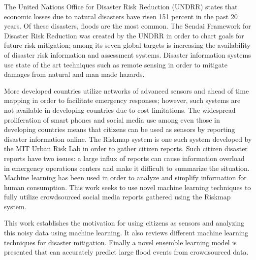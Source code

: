 % 
% 
%


The United Nations Office for Disaster Risk Reduction (UNDRR) states that economic losses
due to natural disasters have risen 151 percent in the past 20 years. Of these 
disasters, floods are the most common. The Sendai Framework for Disaster Risk Reduction 
was created by the UNDRR in order to chart goals for future risk mitigation; among its 
seven global targets is increasing the availability of disaster risk information 
and assessment systems. Disaster information systems use state of the art techniques such as 
remote sensing in order to mitigate damages from natural and man made hazards. 

More developed countries utilize networks of advanced sensors and
ahead of time mapping in order to facilitate emergency responses;
however, such systems are not available in developing countries due to cost limitations.
The widespread proliferation of smart phones and social media use among even those in 
developing countries means that citizens can be used as sensors by reporting 
disaster information online. The Riskmap system is one such system developed by the 
MIT Urban Risk Lab in order to gather citizen reports. Such citizen disaster
reports have two issues: 
a large influx of reports can cause information overload in emergency 
operations centers and make it difficult to summarize the situation. Machine 
learning has been used in order to analyze and simplify information for 
human consumption. This work seeks to use novel machine learning
techniques to fully utilize crowdsourced social media reports gathered
using the Riskmap system.

    This work establishes the motivation for using
citizens as sensors and analyzing this noisy data using machine learning. It also
reviews different machine learning techniques for disaster mitigation. Finally
a novel ensemble learning model is presented that can accurately predict large
flood events from crowdsourced data.